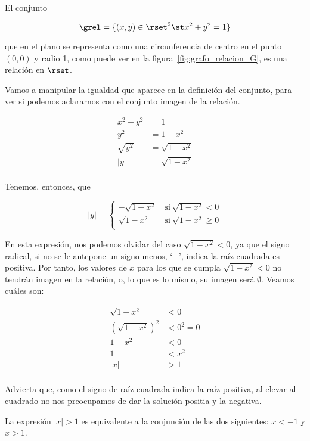 \begin{example}
  El conjunto

  \[ \grel = \{(x, y) \in \rset^2 \st x^2 + y^2 = 1\} \]

  \noindent que en el plano se representa como una circunferencia de centro
  en el punto $(0, 0)$ y radio 1, como puede ver en la
  figura~\ref{fig:grafo_relacion_G}, es una relación en $\rset$.

  Vamos a manipular la igualdad que aparece en la definición del conjunto,
  para ver si podemos aclararnos con el conjunto imagen de la relación.

\begin{align*}
  x^2 + y^2 &= 1 \\
  y^2 &= 1 - x^2 \\
  \sqrt{y^2} &= \sqrt{1 - x^2} \\
  |y| &= \sqrt{1 - x^2} \\
\end{align*}

\noindent Tenemos, entonces, que

$$
  |y| =
  \left\{
    \begin{array}{ll}
      {-\sqrt{1 - x^2}} & \ \text{si} \ \sqrt{1 - x^2} < 0 \\
      \sqrt{1 - x^2} & \ \text{si} \ \sqrt{1 - x^2} \geq 0 \\
    \end{array}
  \right.
$$

\noindent En esta expresión, nos podemos olvidar del caso $\sqrt{1 - x^2} <
0$, ya que el signo radical, si no se le antepone un signo menos, `$-$',
indica la raíz cuadrada es positiva. Por tanto, los valores de $x$ para los
que se cumpla $\sqrt{1 - x^2} < 0$ no tendrán imagen en la relación, o, lo
que es lo mismo, su imagen será $\emptyset$. Veamos cuáles son:

\begin{align*}
  \sqrt{1 - x^2} &< 0 \\
  \left(\sqrt{1 - x^2}\right)^2 &< 0^2 = 0 \\
  1 - x^2 &< 0 \\
  1 &< x^2 \\
  |x| &> 1 \\
\end{align*}

\noindent Advierta que, como el signo de raíz cuadrada indica la raíz
positiva, al elevar al cuadrado no nos preocupamos de dar la solución
positia y la negativa.

La expresión $|x| > 1$ es equivalente a la conjunción de las dos siguientes:
$x < {-1}$ y $x > 1$.


\end{example}
